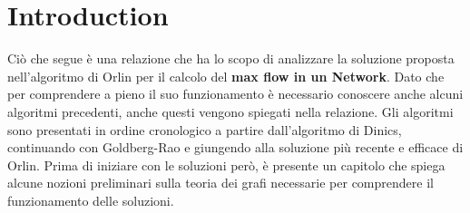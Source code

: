 
\chapter*{Introduction} 

Ciò che segue è una relazione che ha lo scopo di analizzare la soluzione proposta nell'algoritmo di Orlin per il calcolo del \textbf{max flow in un Network}.
Dato che per comprendere a pieno il suo funzionamento è necessario conoscere anche alcuni algoritmi precedenti, anche questi vengono spiegati nella relazione. 
Gli algoritmi sono presentati in ordine cronologico a partire dall'algoritmo di Dinics, continuando con Goldberg-Rao e giungendo alla soluzione più recente e efficace di Orlin.
Prima di iniziare con le soluzioni però, è presente un capitolo che spiega alcune nozioni preliminari sulla teoria dei grafi necessarie per comprendere il funzionamento delle soluzioni.



\cleardoublepage